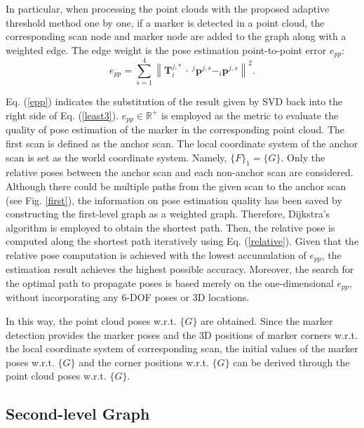 In particular, when processing the point clouds with the proposed adaptive threshold method one by one, if a marker is detected in a point cloud, the corresponding scan node and marker node are added to the graph along with a weighted edge. The edge weight is the pose estimation point-to-point error ${e}_{pp}$:
\begin{equation}	
	{e}_{pp}=\sum_{s=1}^{4}\left\| \mathbf{T}^{j,*}_{i} \ \cdot \ ^{j}\mathbf{p}^{j,s}-_{i}\mathbf{p}^{j,s}\right\|^{2}.\label{epp}
\end{equation}
\par
Eq. (\ref{epp}) indicates the substitution of the result given by SVD back into the right side of Eq. (\ref{least3}). ${e}_{pp} \in \mathbb{R}^{+}$ is employed as the metric to evaluate the quality of pose estimation of the marker in the corresponding point cloud. The first scan is defined as the anchor scan. The local coordinate system of the anchor scan is set as the world coordinate system. 
%
Namely, $\{F\}_{1}=\{G\}$. Only the relative poses between the anchor scan and each non-anchor scan are considered. Although there could be multiple paths from the given scan to the anchor scan (see Fig. \ref{first}), the information on pose estimation quality has been saved by constructing the first-level graph as a weighted graph. Therefore, Dijkstra’s algorithm \cite{dij} is employed to obtain the shortest path. Then, the relative pose is computed along the shortest path iteratively using Eq. (\ref{relative}). Given that the relative pose computation is achieved with the lowest accumulation of $e_{pp}$, the estimation result achieves the highest possible accuracy. Moreover, the search for the optimal path to propagate poses is based merely on the one-dimensional $e_{pp}$, without incorporating any 6-DOF poses or 3D locations.
\par
In this way, the point cloud poses w.r.t. $\{G\}$ are obtained. Since the marker detection provides the marker poses and the 3D positions of marker corners w.r.t. the local coordinate system of corresponding scan, the initial values of the marker poses w.r.t. $\{G\}$ and the corner positions w.r.t. $\{G\}$ can be derived through the point cloud poses w.r.t. $\{G\}$.

\subsection{Second-level Graph} \label{5.5}
 
